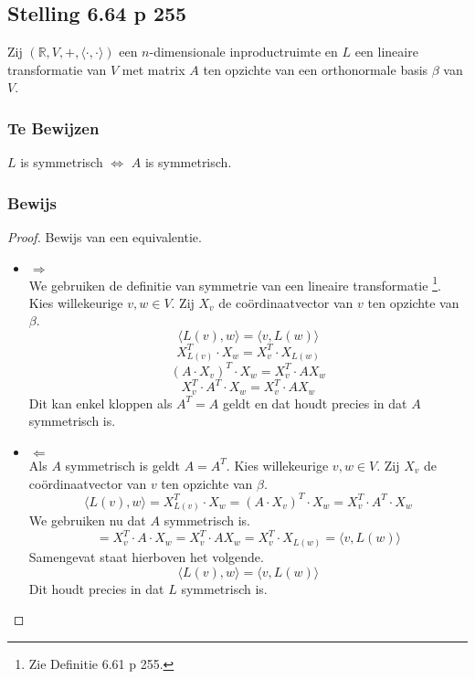 \documentclass[lineaire_algebra_oplossingen.tex]{subfiles}
\begin{document}
\subsection{Stelling 6.64 p 255}
Zij $(\mathbb{R},V,+,\langle \cdot,\cdot \rangle)$ een $n$-dimensionale inproductruimte en $L$ een lineaire transformatie van $V$ met matrix $A$ ten opzichte van een orthonormale basis $\beta$ van $V$.

\subsubsection*{Te Bewijzen}
\begin{center}
$L$ is symmetrisch $\Leftrightarrow$ $A$ is symmetrisch.
\end{center}

\subsubsection*{Bewijs}
\begin{proof}
Bewijs van een equivalentie.\\
\begin{itemize}
\item $\Rightarrow$\\
We gebruiken de definitie van symmetrie van een lineaire transformatie \footnote{Zie Definitie 6.61 p 255.}.
Kies willekeurige $v,w \in V$. Zij $X_v$ de co\"ordinaatvector van $v$ ten opzichte van $\beta$.
\[
\langle L(v),w \rangle = \langle v,L(w)\rangle
\]
\[
X_{L(v)}^T \cdot X_w = X_v^T \cdot X_{L(w)}
\]
\[
(A \cdot X_v)^T \cdot X_w = X_v^T \cdot A X_w
\]
\[
 X_v^T \cdot A^T \cdot X_w = X_v^T \cdot A X_w
\]
Dit kan enkel kloppen als $A^T = A$ geldt en dat houdt precies in dat $A$ symmetrisch is.

\item $\Leftarrow$\\
Als $A$ symmetrisch is geldt $A = A^T$. Kies willekeurige $v,w \in V$. Zij $X_v$ de co\"ordinaatvector van $v$ ten opzichte van $\beta$.
\[
\langle L(v),w \rangle = X_{L(v)}^T \cdot X_w = (A \cdot X_v)^T \cdot X_w =  X_v^T \cdot A^T \cdot X_w 
\]
We gebruiken nu dat $A$ symmetrisch is.
\[
=  X_v^T \cdot A \cdot X_w = X_v^T \cdot A X_w = X_v^T \cdot X_{L(w)} = \langle v,L(w)\rangle
\]
Samengevat staat hierboven het volgende.
\[
\langle L(v),w \rangle = \langle v,L(w)\rangle
\]
Dit houdt precies in dat $L$ symmetrisch is.
\end{itemize}
\end{proof}
\end{document}
